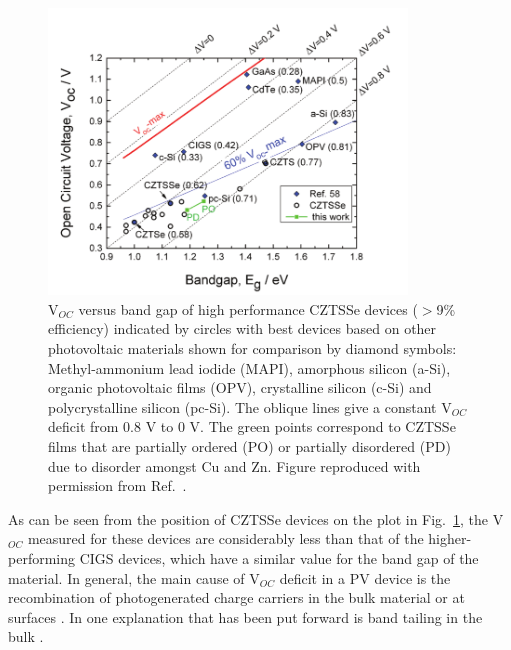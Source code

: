 \documentclass[11pt, twoside]{report}
\begin{document}
\begin{figure}[h!]
  \centering
    \includegraphics[width=0.85\textwidth]{figures/Voc.png}
    \caption[V$_{OC}$ versus band gap of high performance CZTSSe devices ($>$9\% efficiency) indicated by circles with best devices based on other photovoltaic materials shown for comparison by diamond symbols: Methyl-ammonium lead iodide (MAPI), amorphous silicon (a-Si), organic photovoltaic films (OPV), crystalline silicon (c-Si) and polycrystalline silicon (pc-Si). The oblique lines give a constant V$_{OC}$ deficit from 0.8 V to 0 V. The green points correspond to CZTSSe films that are partially ordered (PO) or partially disordered (PD) due to disorder amongst Cu and Zn.]{V$_{OC}$ versus band gap of high performance CZTSSe devices ($>$9\% efficiency) indicated by circles with best devices based on other photovoltaic materials shown for comparison by diamond symbols: Methyl-ammonium lead iodide (MAPI), amorphous silicon (a-Si), organic photovoltaic films (OPV), crystalline silicon (c-Si) and polycrystalline silicon (pc-Si). The oblique lines give a constant V$_{OC}$ deficit from 0.8 V to 0 V. The green points correspond to CZTSSe films that are partially ordered (PO) or partially disordered (PD) due to disorder amongst Cu and Zn. Figure reproduced with permission from Ref.~.}
  \label{Voc}
\end{figure}

As can be seen from the position of CZTSSe devices on the plot in Fig.~\ref{Voc}, the V$_{OC}$ measured for these devices are considerably less than that of the higher-performing CIGS devices, which have a similar value for the band gap of the material.
In general, the main cause of V$_{OC}$ deficit in a PV device is the recombination of photogenerated charge carriers in the bulk material or at surfaces \cite{culprit}. In {\CZTS} one explanation that has been put forward is band tailing in the bulk \cite{band_tail}.
\end{document}
